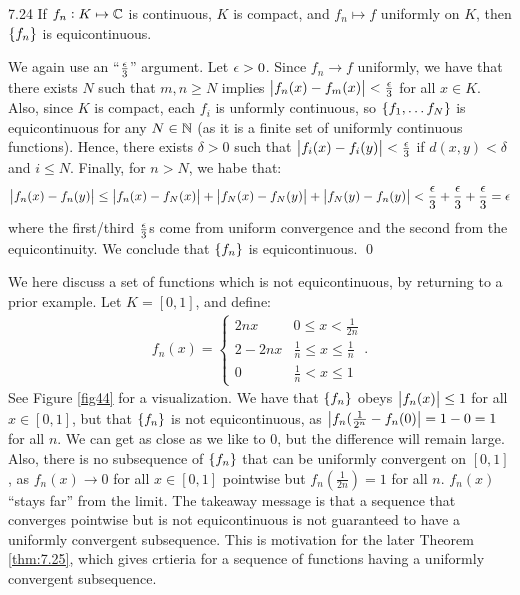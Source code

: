 \begin{theorem}{}{7.24}
    If $f_n: K \mapsto \mathbb{C}$ is continuous, $K$ is compact, and $f_n \mapsto f$ uniformly on $K$, then $\set{f_n}$ is equicontinuous.
\end{theorem}
\begin{nproof}
    We again use an ``$\frac{\epsilon}{3}$'' argument. Let $\epsilon > 0$. Since $f_n \rightarrow f$ uniformly, we have that there exists $N$ such that $m, n \geq N$ implies $\abs{f_n(x) - f_m(x)} < \frac{\epsilon}{3}$ for all $x \in K$. Also, since $K$ is compact, each $f_i$ is unformly continuous, so $\set{f_1, \ldots f_N}$ is equicontinuous for any $N \in \mathbb{N}$ (as it is a finite set of uniformly continuous functions). Hence, there exists $\delta > 0$ such that $\abs{f_i(x) - f_i(y)} < \frac{\epsilon}{3}$ if $d(x, y) < \delta$ and $i \leq N$. Finally, for $n > N$, we habe that:
    \begin{align*}
        \abs{f_n(x) - f_n(y)} \leq \abs{f_n(x) - f_N(x)} + \abs{f_N(x) - f_N(y)} + \abs{f_N(y) - f_n(y)} < \frac{\epsilon}{3} + \frac{\epsilon}{3} + \frac{\epsilon}{3} = \epsilon
    \end{align*}
    where the first/third $\frac{\epsilon}{3}$s come from uniform convergence and the second from the equicontinuity. We conclude that $\set{f_n}$ is equicontinuous. \qed
\end{nproof}

\begin{nexample}{}{}
    We here discuss a set of functions which is not equicontinuous, by returning to a prior example. Let $K = [0, 1]$, and define:
    \begin{align*}
        f_n(x) = \begin{cases}
            2nx & 0 \leq x < \frac{1}{2n}
            \\ 2 - 2nx & \frac{1}{n} \leq x \leq \frac{1}{n}
            \\ 0 & \frac{1}{n} < x \leq 1
        \end{cases}.
    \end{align*}
    See Figure \ref{fig44} for a visualization. We have that $\set{f_n}$ obeys $\abs{f_n(x)} \leq 1$ for all $x \in [0, 1]$, but that $\set{f_n}$ is not equicontinuous, as $\abs{f_n(\frac{1}{2^n} - f_n(0)} = 1 - 0 = 1$ for all $n$. We can get as close as we like to $0$, but the difference will remain large. Also, there is no subsequence of $\set{f_n}$ that can be uniformly convergent on $[0, 1]$, as $f_n(x) \rightarrow 0$ for all $x \in [0, 1]$ pointwise but $f_n(\frac{1}{2n}) = 1$ for all $n$. $f_n(x)$ ``stays far'' from the limit. The takeaway message is that a sequence that converges pointwise but is not equicontinuous is not guaranteed to have a uniformly convergent subsequence. This is motivation for the later Theorem \ref{thm:7.25}, which gives crtieria for a sequence of functions having a uniformly convergent subsequence.
\end{nexample}

